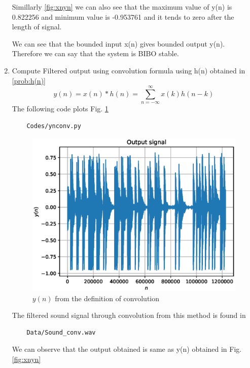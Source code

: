 \documentclass[journal,12pt,twocolumn]{IEEEtran}
\renewcommand\thesection{\arabic{section}}
\begin{document}
\begin{enumerate}[label=\thesection.\arabic*,ref=\thesection.\theenumi]
Simillarly \ref{fig:xnyn} we can also see that the maximum value of y(n) is 0.822256 and minimum value is -0.953761 and it tends to zero after the length of signal.

We can see that the bounded input x(n) gives bounded output
y(n). Therefore we can say that the system is BIBO stable.

\item Compute Filtered output using convolution formula using h(n) obtained in \ref{prob:h(n)}
%
\begin{equation}
\label{eq:convolution}
y(n) = x(n)*h(n) = \sum_{n=-\infty}^{\infty}x(k)h(n-k)
\end{equation}
\solution The following code plots Fig. \ref{fig:yn_conv}
%
\begin{lstlisting}
    Codes/ynconv.py
\end{lstlisting}
\begin{figure}[!ht]
\centering
\includegraphics[width=\columnwidth]{./figs/yn_conv}
\caption{$y(n)$ from the definition of convolution}
\label{fig:yn_conv}
\end{figure}
The filtered sound signal through convolution from this method is found in
\begin{lstlisting}
    Data/Sound_conv.wav
\end{lstlisting}
We can observe that the output obtained is same as y(n) obtained in Fig. \ref{fig:xnyn}

\end{enumerate}
\end{document}
